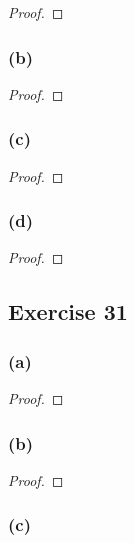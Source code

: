 \documentclass[14pt]{extarticle}
\begin{document}
\begin{proof}

\end{proof}

\subsubsection{(b)}

\begin{proof}

\end{proof}

\subsubsection{(c)}

\begin{proof}

\end{proof}

\subsubsection{(d)}

\begin{proof}

\end{proof}

\subsection{Exercise 31}

\subsubsection{(a)}

\begin{proof}

\end{proof}

\subsubsection{(b)}

\begin{proof}

\end{proof}

\subsubsection{(c)}
\end{document}
